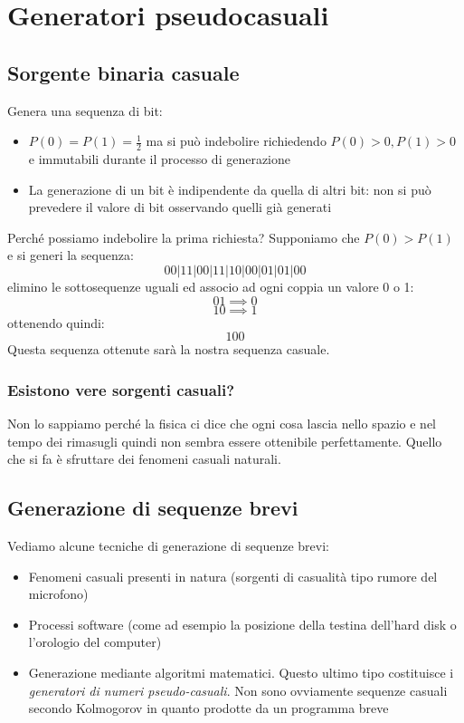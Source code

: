 \section{Generatori pseudocasuali}

\subsection{Sorgente binaria casuale}
Genera una sequenza di bit:
\begin{itemize}
    \item $P(0) = P(1) = \frac{1}{2}$ ma si può indebolire richiedendo $P(0)>0, P(1)>0$ e immutabili durante il processo di generazione
    \item La generazione di un bit è indipendente da quella di altri bit: non si può prevedere il valore di bit osservando quelli già generati
\end{itemize}
Perché possiamo indebolire la prima richiesta? Supponiamo che $P(0) > P(1)$ e si generi la sequenza:
$$ 00|11|00|11|10|00|01|01|00 $$
elimino le sottosequenze uguali ed associo ad ogni coppia un valore 0 o 1:
$$ 01 \implies 0 $$
$$ 10 \implies 1 $$
ottenendo quindi:
$$ 100 $$
Questa sequenza ottenute sarà la nostra sequenza casuale.

\subsubsection{Esistono vere sorgenti casuali?}
Non lo sappiamo perché la fisica ci dice che ogni cosa lascia nello spazio e nel tempo dei rimasugli quindi non sembra essere ottenibile perfettamente.
Quello che si fa è sfruttare dei fenomeni casuali naturali.

\subsection{Generazione di sequenze brevi}
Vediamo alcune tecniche di generazione di sequenze brevi:
\begin{itemize}
    \item Fenomeni casuali presenti in natura (sorgenti di casualità tipo rumore del microfono)
    \item Processi software (come ad esempio la posizione della testina dell'hard disk o l'orologio del computer)
    \item Generazione mediante algoritmi matematici. Questo ultimo tipo costituisce i \emph{generatori di numeri pseudo-casuali}. Non sono ovviamente sequenze casuali secondo Kolmogorov in quanto prodotte da un programma breve
\end{itemize}


